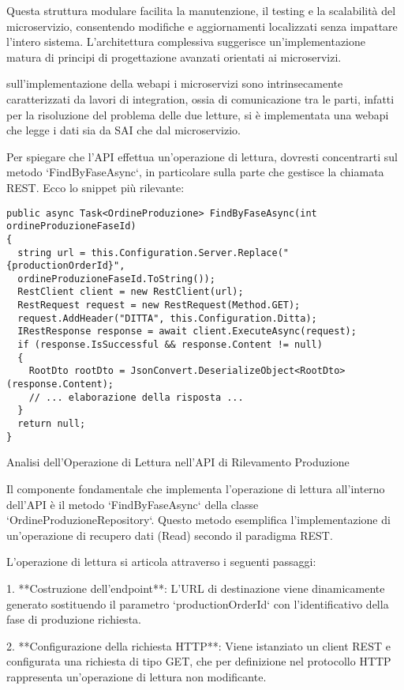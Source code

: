 Questa struttura modulare facilita la manutenzione, il testing e la scalabilità del microservizio, consentendo modifiche e aggiornamenti localizzati senza impattare l'intero sistema. L'architettura complessiva suggerisce un'implementazione matura di principi di progettazione avanzati orientati ai microservizi.

sull'implementazione della webapi
i microservizi sono intrinsecamente caratterizzati da lavori di integration, ossia di comunicazione tra le parti, infatti per la risoluzione del problema delle due letture, si è implementata una webapi che legge i dati sia da SAI che dal microservizio. 

Per spiegare che l'API effettua un'operazione di lettura, dovresti concentrarti sul metodo `FindByFaseAsync`, in particolare sulla parte che gestisce la chiamata REST. Ecco lo snippet più rilevante:

\begin{verbatim}
public async Task<OrdineProduzione> FindByFaseAsync(int ordineProduzioneFaseId)
{
  string url = this.Configuration.Server.Replace("{productionOrderId}", 
  ordineProduzioneFaseId.ToString());
  RestClient client = new RestClient(url);
  RestRequest request = new RestRequest(Method.GET);
  request.AddHeader("DITTA", this.Configuration.Ditta);
  IRestResponse response = await client.ExecuteAsync(request);
  if (response.IsSuccessful && response.Content != null)
  {
    RootDto rootDto = JsonConvert.DeserializeObject<RootDto>(response.Content);
    // ... elaborazione della risposta ...
  }
  return null;
}
\end{verbatim}

Analisi dell'Operazione di Lettura nell'API di Rilevamento Produzione

Il componente fondamentale che implementa l'operazione di lettura all'interno dell'API è il metodo `FindByFaseAsync` della classe `OrdineProduzioneRepository`. Questo metodo esemplifica l'implementazione di un'operazione di recupero dati (Read) secondo il paradigma REST.

L'operazione di lettura si articola attraverso i seguenti passaggi:

1. **Costruzione dell'endpoint**: L'URL di destinazione viene dinamicamente generato sostituendo il parametro `{productionOrderId}` con l'identificativo della fase di produzione richiesta.

2. **Configurazione della richiesta HTTP**: Viene istanziato un client REST e configurata una richiesta di tipo GET, che per definizione nel protocollo HTTP rappresenta un'operazione di lettura non modificante.


